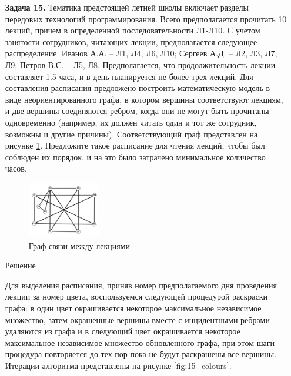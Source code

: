 \documentclass{article}
\begin{document}
\clearpage%
\begin{enumerate}
\item[\textbf{Задача 15.}] Тематика предстоящей летней школы включает разделы передовых технологий программирования. Всего предполагается прочитать 10 лекций, причем в определенной последовательности Л1-Л10. С учетом занятости сотрудников, читающих лекции, предполагается следующее распределение: Иванов А.А. – Л1, Л4, Л6, Л10; Сергеев А.Д. – Л2, Л3, Л7, Л9; Петров В.С. – Л5, Л8. Предполагается, что продолжительность лекции составляет 1.5 часа, и в день планируется не более трех лекций. Для составления расписания предложено построить математическую модель в виде неориентированного графа, в котором вершины соответствуют лекциям, и две вершины соединяются ребром, когда они не могут быть прочитаны одновременно (например, их должен читать один и тот же сотрудник, возможны и другие причины). Соответствующий граф представлен на рисунке \ref{fig:15_graph}. Предложите такое расписание для чтения лекций, чтобы был соблюден их порядок, и на это было затрачено минимальное количество часов. 
\begin{figure}[ht]
    \includegraphics[width=0.3\textwidth, center]{attachments/15/15_0.png}
    \caption{Граф связи между лекциями}
    \label{fig:15_graph}
\end{figure}
\begin{center}
Решение 
\end{center}
Для выделения расписания, приняв номер предполагаемого дня проведения лекции за номер цвета, воспользуемся следующей процедурой раскраски графа: в один цвет окрашивается некоторое максимальное независимое множество, затем окрашенные вершины вместе с инцидентными ребрами удаляются из графа и в следующий цвет окрашивается некоторое максимальное независимое множество обновленного графа, при этом шаги процедура повторяется до тех пор пока не будут раскрашены все вершины. Итерации алгоритма представлены на рисунке \ref{fig:15_colours}.
\begin{figure}[ht]
     \centering
     \begin{subfigure}[b]{0.3\textwidth}
        \centering

\end{subfigure}
\end{figure}
\end{enumerate}
\end{document}
